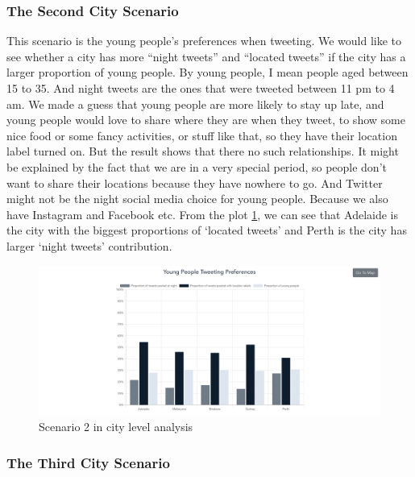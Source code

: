 \documentclass{article}
\begin{document}
\subsubsection{The Second City Scenario} 

This scenario is the young people's preferences when tweeting. We would like to see whether a city has more “night tweets” and “located tweets” if the city has a larger proportion of young people. By young people, I mean people aged between 15 to 35. And night tweets are the ones that were tweeted between 11 pm to 4 am. We made a guess that young people are more likely to stay up late, and young people would love to share where they are when they tweet, to show some nice food or some fancy activities, or stuff like that, so they have their location label turned on. But the result shows that there no such relationships. It might be explained by the fact that we are in a very special period, so people don’t want to share their locations because they have nowhere to go. And Twitter might not be the night social media choice for young people. Because we also have Instagram and Facebook etc. From the plot
\ref{fig:Young_people_tweeting_preference}, we can see that Adelaide is the city with the biggest proportions of ‘located tweets’ and Perth is the city has larger ‘night tweets’ contribution.
\begin{figure}[htp]
\centering
\includegraphics[width=\textwidth]{img/Young_people_tweeting_preference.png}
\caption{Scenario 2 in city level analysis}
\label{fig:Young_people_tweeting_preference}
\end{figure} 

\subsubsection{The Third City Scenario}
\end{document}
